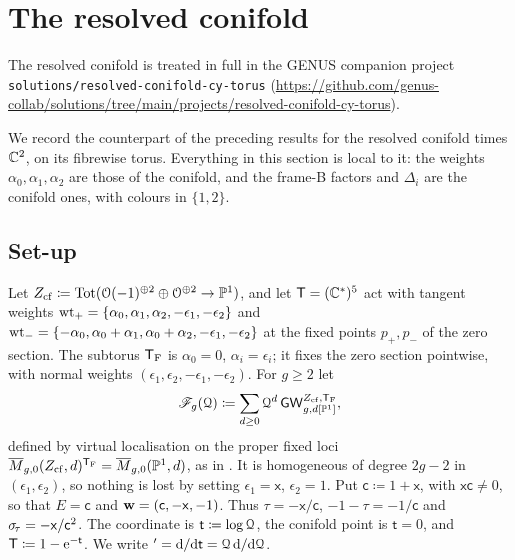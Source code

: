 \providecommand{\xc}{\mathsf{x}}
\providecommand{\cc}{\mathsf{c}}
\providecommand{\tcn}{\mathsf{t}}
\providecommand{\Tcn}{\mathsf{T}}
\section{The resolved conifold}
\label{sec:con}
\noindent The resolved conifold is treated in full in the GENUS companion project \texttt{solutions/resolved-conifold-cy-torus} (\url{https://github.com/genus-collab/solutions/tree/main/projects/resolved-conifold-cy-torus}).



We record the counterpart of the preceding results for the resolved conifold times $\mathbb{C}^2$, on its fibrewise torus. Everything in this section is local to it: the weights $\alpha_0,\alpha_1,\alpha_2$ are those of the conifold, and the frame-B factors and $\Delta_i$ are the conifold ones, with colours in $\{1,2\}$.

\subsection{Set-up}

Let $Z_{\mathrm{cf}}\coloneqq\mathrm{Tot}(\mathcal{O}(-1)^{\oplus 2}\oplus\mathcal{O}^{\oplus 2}\to\mathbb{P}^1)$, and let $\mathsf{T}=(\mathbb{C}^*)^5$ act with tangent weights $\mathrm{wt}_+=\{\alpha_0,\alpha_1,\alpha_2,-\epsilon_1,-\epsilon_2\}$ and $\mathrm{wt}_-=\{-\alpha_0,\alpha_0+\alpha_1,\alpha_0+\alpha_2,-\epsilon_1,-\epsilon_2\}$ at the fixed points $p_+,p_-$ of the zero section. The subtorus $\mathsf{T}_{\mathrm{F}}$ is $\alpha_0=0$, $\alpha_i=\epsilon_i$; it fixes the zero section pointwise, with normal weights $(\epsilon_1,\epsilon_2,-\epsilon_1,-\epsilon_2)$. For $g\geq 2$ let
\[
\mathscr{F}_g(\mathcal{Q})\coloneqq\sum_{d\geq 0}\mathcal{Q}^d\,\mathsf{GW}^{Z_{\mathrm{cf}},\mathsf{T}_{\mathrm{F}}}_{g,d[\mathbb{P}^1]},
\]
defined by virtual localisation on the proper fixed loci $\overline{M}_{g,0}(Z_{\mathrm{cf}},d)^{\mathsf{T}_{\mathrm{F}}}=\overline{M}_{g,0}(\mathbb{P}^1,d)$, as in \cite{BS}. It is homogeneous of degree $2g-2$ in $(\epsilon_1,\epsilon_2)$, so nothing is lost by setting $\epsilon_1=\xc$, $\epsilon_2=1$. Put $\cc\coloneqq1+\xc$, with $\xc\cc\neq 0$, so that $E=\cc$ and $\bw=(\cc,-\xc,-1)$. Thus $\tau=-\xc/\cc$, $-1-\tau=-1/\cc$ and $\st=-\xc/\cc^2$. The coordinate is $\tcn\coloneqq\log\cQ$, the conifold point is $\tcn=0$, and $\Tcn\coloneqq1-\re^{-\tcn}$. We write ${}'=\dd/\dd\tcn=\cQ\,\dd/\dd\cQ$.

